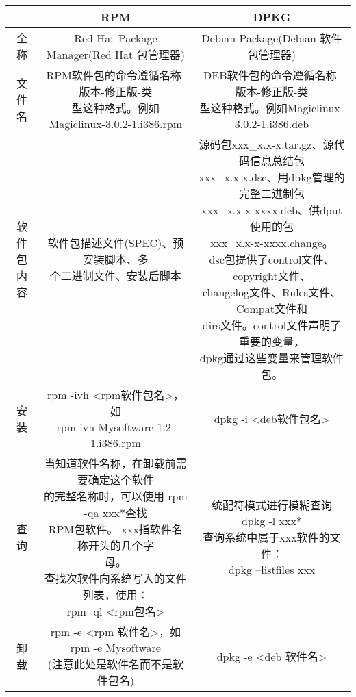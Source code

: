 \begin{center}
{\wuhao
\begin{tabular}{c|c|c}
\hline
& RPM & DPKG\\
\hline
全称 & Red Hat Package Manager(Red Hat 包管理器)& Debian Package(Debian 软件包管理器)\\
\hline
文件名 &\tabincell{c}{RPM软件包的命令遵循名称-版本-修正版-类\\型这种格式。例如 Magiclinux-3.0.2-1.i386.rpm} & \tabincell{c}{DEB软件包的命令遵循名称-版本-修正版-类\\型这种格式。例如Magiclinux-3.0.2-1.i386.deb}\\
\hline
\tabincell{c}{软件包\\内容} & \tabincell{l}{软件包描述文件(SPEC)、预安装脚本、多\\个二进制文件、安装后脚本}&\tabincell{l}{源码包xxx\_x.x-x.tar.gz、源代码信息总结包\\xxx\_x.x-x.dsc、用dpkg管理的完整二进制包\\xxx\_x.x-x-xxxx.deb、供dput使用的包\\xxx\_x.x-x-xxxx.change。\\ dsc包提供了control文件、copyright文件、\\changelog文件、Rules文件、Compat文件和\\dirs文件。control文件声明了重要的变量，\\dpkg通过这些变量来管理软件包。}\\
\hline
安装 & \tabincell{l}{rpm -ivh <rpm软件包名>，如\\ rpm-ivh Mysoftware-1.2-1.i386.rpm} & dpkg -i <deb软件包名>\\
\hline
查询 & \tabincell{l}{当知道软件名称，在卸载前需要确定这个软件\\的完整名称时，可以使用
rpm -qa xxx*查找\\RPM包软件。 xxx指软件名称开头的几个字\\母。\\查找次软件向系统写入的文件列表，使用：\\ rpm -ql <rpm包名>} &
\tabincell{l}{统配符模式进行模糊查询\\ dpkg -l xxx* \\ 查询系统中属于xxx软件的文件：\\ dpkg --listfiles xxx}\\
\hline
卸载  & \tabincell{l}{rpm -e <rpm 软件名>，如 rpm -e Mysoftware\\(注意此处是软件名而不是软件包名)} &
dpkg -e <deb 软件名>\\
\hline
\end{tabular}}
\end{center} 

